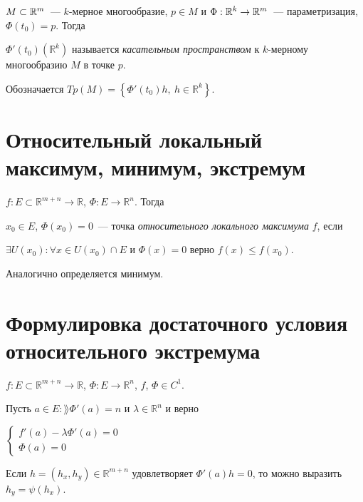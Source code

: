 \documentclass{article}
\begin{document}
        $M \subset \mathbb{R}^m$~--- $k$-мерное многообразие, $p \in M$ и $\Phi : \mathbb{R}^k \rightarrow \mathbb{R}^m$~--- параметризация, $\Phi(t_0) = p$. Тогда 
        
        $\Phi'(t_0) \left( \mathbb{R}^k \right)$ называется \textit{касательным пространством} к $k$-мерному многообразию $M$ в точке $p$. 
        
        Обозначается $Tp(M) = \left\{ \Phi'(t_0) h, \ h \in \mathbb{R}^k \right\}$.
        
    \newpage
    
    \section{Относительный локальный максимум, минимум, экстремум}
    
        $f : E \subset \mathbb{R}^{m + n} \rightarrow \mathbb{R}$, $\Phi : E \rightarrow \mathbb{R}^n$. Тогда
        
        $x_0 \in E$, $\Phi(x_0) = 0$~--- точка \textit{относительного локального максимума} $f$, если 
        
        $\exists U (x_0) : \forall x \in U(x_0) \cap E$ и $\Phi(x) = 0$ верно $f(x) \leqslant f(x_0)$. 
        
        Аналогично определяется минимум.
        
    \newpage
    
    \section{Формулировка достаточного условия относительного экстремума}
    
        $f : E \subset \mathbb{R}^{m + n} \rightarrow \mathbb{R}$, $\Phi : E \rightarrow \mathbb{R}^n$, $f$, $\Phi \in C^1$.
        
        Пусть $a \in E : \rang \Phi'(a) = n$ и $\lambda \in \mathbb{R}^n$ и верно
        
        $
            \begin{cases}
    
                f'(a) - \lambda \Phi'(a) = 0 \\
                
                \Phi(a) = 0
                
            \end{cases}
        $
        
        Если $h = ( h_x, h_y ) \in \mathbb{R}^{m + n}$ удовлетворяет $\Phi'(a) h = 0$, то можно выразить $h_y = \psi(h_x)$.
        
\end{document}
